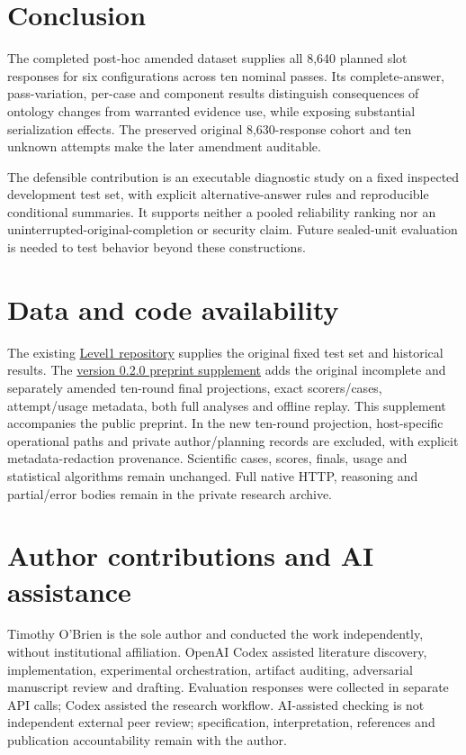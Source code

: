 \documentclass[a4paper,preprint,12pt,numbers,nopreprintline]{elsarticle}
\begin{document}
\section{Conclusion}
The completed post-hoc amended dataset supplies all 8,640 planned slot responses for six configurations across ten nominal passes. Its complete-answer, pass-variation, per-case and component results distinguish consequences of ontology changes from warranted evidence use, while exposing substantial serialization effects. The preserved original 8,630-response cohort and ten unknown attempts make the later amendment auditable.

The defensible contribution is an executable diagnostic study on a fixed inspected development test set, with explicit alternative-answer rules and reproducible conditional summaries. It supports neither a pooled reliability ranking nor an uninterrupted-original-completion or security claim. Future sealed-unit evaluation is needed to test behavior beyond these constructions.

\section*{Data and code availability}
The existing \href{https://github.com/prosessleder/semantic-epistemic-governance-level1}{Level1 repository} supplies the original fixed test set and historical results. The \href{https://github.com/prosessleder/semantic-epistemic-governance-level1/releases/tag/v0.2.0-preprint}{version 0.2.0 preprint supplement} adds the original incomplete and separately amended ten-round final projections, exact scorers/cases, attempt/usage metadata, both full analyses and offline replay. This supplement accompanies the public preprint. In the new ten-round projection, host-specific operational paths and private author/planning records are excluded, with explicit metadata-redaction provenance. Scientific cases, scores, finals, usage and statistical algorithms remain unchanged. Full native HTTP, reasoning and partial/error bodies remain in the private research archive.

\section*{Author contributions and AI assistance}
Timothy O'Brien is the sole author and conducted the work independently, without institutional affiliation. OpenAI Codex assisted literature discovery, implementation, experimental orchestration, artifact auditing, adversarial manuscript review and drafting. Evaluation responses were collected in separate API calls; Codex assisted the research workflow. AI-assisted checking is not independent external peer review; specification, interpretation, references and publication accountability remain with the author.
\end{document}
